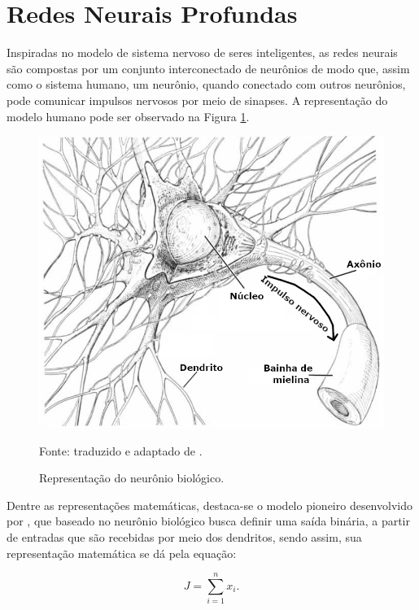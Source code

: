 \newpage
\clearpage

\section{Redes Neurais Profundas}
\label{deep:deep}
Inspiradas no modelo de sistema nervoso de seres inteligentes, as redes neurais são compostas por um conjunto interconectado de neurônios de modo que, assim como o sistema humano, um neurônio, quando conectado com outros neurônios, pode comunicar impulsos nervosos por meio de sinapses. A representação do modelo humano pode ser observado na Figura \ref{deep:fig:1}.

\begin{figure}[H]
    \centering
    \caption{Representação do neurônio biológico.}
    \includegraphics[width=1\linewidth]{recursos/imagens/deep/neuronio.png}
    \label{deep:fig:1}

    Fonte: traduzido e adaptado de \cite{Stevens1979}.
\end{figure}

Dentre as representações matemáticas, destaca-se o modelo pioneiro desenvolvido por \cite{mcculloch1943logical}, que baseado no neurônio biológico busca definir uma saída binária, a partir de entradas que são recebidas por meio dos dendritos, sendo assim, sua representação matemática se dá pela equação:

\begin{equation}
    \label{deep:eq:1}
    J = \sum_{i = 1}^{n} x_i.
\end{equation}

